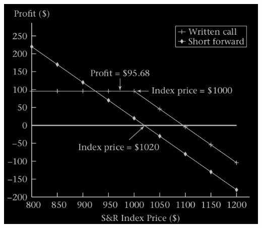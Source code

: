 \begin{frame}[fragile]
\begin{center}
	\includegraphics[scale=0.2]{figs/Figure-2-7.png}
\end{center}
\end{frame}

